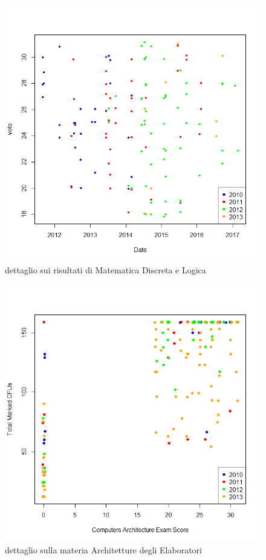                 \begin{figure}
                    \centering
                    \caption{dettaglio sui risultati di Matematica Discreta e Logica}
                    \label{mdl_2}
                	\includegraphics[scale=0.5]{img/scatter_plot_9.png}
                \end{figure}

                \begin{figure}
                    \centering
                    \caption{dettaglio sulla materia Architetture degli Elaboratori}
                    \label{ade}
                	\includegraphics[scale=0.5]{img/scatter_plot_6.png}
                \end{figure}

